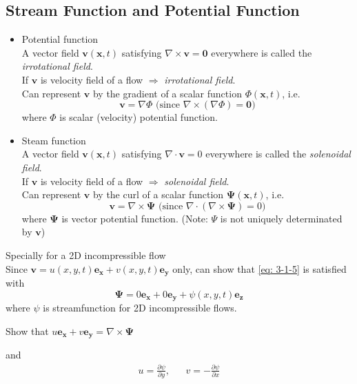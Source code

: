 \subsection{Stream Function and Potential Function}
\begin{itemize}
\item Potential function\\
A vector field $\mathbf{v}(\mathbf{x},t)$ satisfying $\nabla\times\mathbf{v} = \mathbf{0}$ everywhere is called the \emph{irrotational field}. \\
If $\mathbf{v}$ is velocity field of a flow $\Longrightarrow$ \emph{irrotational field}. \\
Can represent $\mathbf{v}$ by the gradient of a scalar function $\Phi(\mathbf{x},t)$, i.e.
\begin{equation}
\mathbf{v} = \nabla\Phi\text{ (since $\nabla\times\left(\nabla\Phi\right) = \mathbf{0}$)}
\label{eq: 3-1-4}
\end{equation}
where $\Phi$ is scalar (velocity) potential function.
\item Steam function\\
A vector field $\mathbf{v}(\mathbf{x},t)$ satisfying $\nabla\cdot\mathbf{v} = 0$ everywhere is called the \emph{solenoidal field}. \\
If $\mathbf{v}$ is velocity field of a flow $\Longrightarrow$ \emph{solenoidal field}. \\
Can represent $\mathbf{v}$ by the curl of a scalar function $\boldsymbol{\Psi}(\mathbf{x},t)$, i.e.
\begin{equation}
\mathbf{v} = \nabla\times\boldsymbol{\Psi}\text{ (since $\nabla\cdot\left(\nabla\times\boldsymbol{\Psi}\right) = 0$)}
\label{eq: 3-1-5}
\end{equation}
where $\boldsymbol{\Psi}$ is vector potential function. (Note: $\Psi$ is not uniquely determinated by $\mathbf{v}$)
\end{itemize}
Specially for a 2D incompressible flow\\
Since $\mathbf{v} = u(x,y,t)\mathbf{e_x} + v(x,y,t)\mathbf{e_y}$ only, can show that \eqref{eq: 3-1-5} is satisfied with
\[
\boldsymbol{\Psi} = 0\mathbf{e_x} + 0\mathbf{e_y} + \psi(x,y,t)\mathbf{e_z}
\]
where $\psi$ is streamfunction for 2D incompressible flows.
\begin{exercise}
Show that $u\mathbf{e_x} + v\mathbf{e_y} = \nabla\times\boldsymbol{\Psi}$
\end{exercise}
and 
\begin{align*}
u = \frac{\partial\psi}{\partial y}, &&v = -\frac{\partial\psi}{\partial x}
\end{align*}
